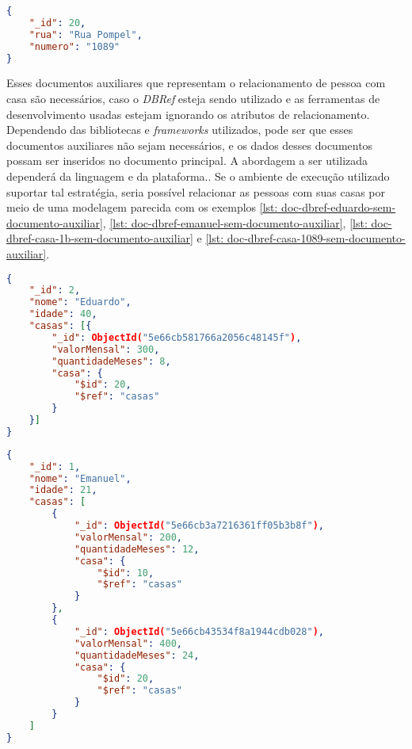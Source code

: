 \begin{lstlisting}[language=json, caption={Documento da Casa de Número 1089\label{lst: doc-dbref-auxiliar-casa-1089}}]
{
    "_id": 20,
    "rua": "Rua Pompel",
    "numero": "1089"
}
\end{lstlisting}

Esses documentos auxiliares que representam o relacionamento de pessoa com casa são necessários, caso o \textit{DBRef} esteja sendo utilizado e as ferramentas de desenvolvimento usadas estejam ignorando os atributos de relacionamento. Dependendo das bibliotecas e \textit{frameworks} utilizados, pode ser que esses documentos auxiliares não sejam necessários, e os dados desses documentos possam ser inseridos no documento principal. A abordagem a ser utilizada dependerá da linguagem e da plataforma.. Se o ambiente de execução utilizado suportar tal estratégia, seria possível relacionar as pessoas com suas casas por meio de uma modelagem parecida com os exemplos \ref{lst: doc-dbref-eduardo-sem-documento-auxiliar}, \ref{lst: doc-dbref-emanuel-sem-documento-auxiliar}, \ref{lst: doc-dbref-casa-1b-sem-documento-auxiliar} e \ref{lst: doc-dbref-casa-1089-sem-documento-auxiliar}.

\begin{lstlisting}[language=json, caption={Documento da Pessoa \textit{Eduardo} Sem Documento Auxiliar\label{lst: doc-dbref-eduardo-sem-documento-auxiliar}}]
{
    "_id": 2,
    "nome": "Eduardo",
    "idade": 40,
    "casas": [{
        "_id": ObjectId("5e66cb581766a2056c48145f"),
        "valorMensal": 300,
        "quantidadeMeses": 8,
        "casa": {
            "$id": 20,
            "$ref": "casas"
        }
    }]
}
\end{lstlisting}

\begin{lstlisting}[language=json, caption={Documento da Pessoa \textit{Emanuel} Sem Documento Auxiliar\label{lst: doc-dbref-emanuel-sem-documento-auxiliar}}]
{
    "_id": 1,
    "nome": "Emanuel",
    "idade": 21,
    "casas": [
        {
            "_id": ObjectId("5e66cb3a7216361ff05b3b8f"),
            "valorMensal": 200,
            "quantidadeMeses": 12,
            "casa": {
                "$id": 10,
                "$ref": "casas"
            }
        },
        {
            "_id": ObjectId("5e66cb43534f8a1944cdb028"),
            "valorMensal": 400,
            "quantidadeMeses": 24,
            "casa": {
                "$id": 20,
                "$ref": "casas"
            }
        }
    ]
}
\end{lstlisting}

